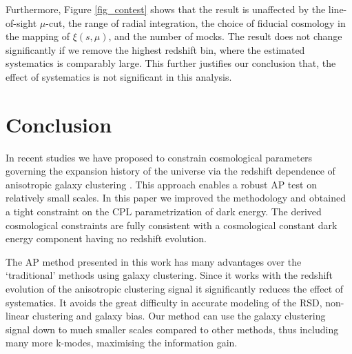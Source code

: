 \documentclass[iop]{emulateapj}
\begin{document}
Furthermore, Figure \ref{fig_contest} shows that 
the result is unaffected by the line-of-sight $\mu$-cut, 
the range of radial integration, 
the choice of fiducial cosmology in the mapping of $\xi(s,\mu)$,
and the number of mocks.
The result does not change significantly if we remove the highest redshift bin,
where the estimated systematics is comparably large.
This further justifies our conclusion that, the effect of systematics is not significant in this analysis.


\section{Conclusion}

In recent studies we have proposed to constrain cosmological parameters 
governing the expansion history of the universe via 
the redshift dependence of anisotropic galaxy clustering \citep{Li2014,Li2015,Li2016}.
This approach enables a robust AP test on relatively small scales.
In this paper we improved the methodology and obtained a tight constraint 
on the CPL parametrization of dark energy.
The derived cosmological constraints are fully consistent with a cosmological constant 
dark energy component having no redshift evolution.


The AP method presented in this work has many advantages over the 
`traditional' methods using galaxy clustering.
Since it works with the redshift evolution of the anisotropic clustering signal it significantly reduces the effect of systematics. 
It avoids the great difficulty in accurate modeling of the RSD, non-linear clustering and galaxy bias.
Our method can use the galaxy clustering signal down to
much smaller scales compared to other methods, thus including many more k-modes, maximising the information gain.
\end{document}
